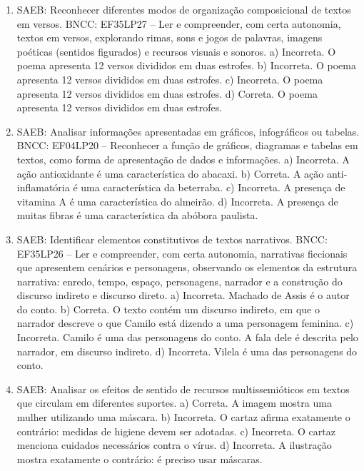 \begin{enumerate}
\item
SAEB: Reconhecer diferentes modos de organização composicional de textos em versos. BNCC: EF35LP27 -- Ler e compreender, com certa autonomia, textos em versos, explorando rimas, sons e jogos de palavras, imagens poéticas (sentidos figurados) e recursos visuais e sonoros. a) Incorreta. O poema apresenta 12 versos divididos em duas estrofes. b) Incorreta. O poema apresenta 12 versos divididos em duas estrofes. c) Incorreta. O poema apresenta 12 versos divididos em duas estrofes. d) Correta. O poema apresenta 12 versos divididos em duas estrofes.

\item
SAEB: Analisar informações apresentadas em gráficos, infográficos ou tabelas. BNCC: EF04LP20 -- Reconhecer a função de gráficos, diagramas e tabelas em textos, como forma de apresentação de dados e informações. a) Incorreta. A ação antioxidante é uma característica do abacaxi. b) Correta. A ação anti-inflamatória é uma característica da beterraba. c) Incorreta. A presença de vitamina A é uma característica do almeirão. d) Incorreta. A presença de muitas fibras é uma característica da abóbora paulista.

\item
SAEB: Identificar elementos constitutivos de textos narrativos. BNCC: EF35LP26 -- Ler e compreender, com certa autonomia, narrativas ficcionais que apresentem cenários e personagens, observando os elementos da estrutura narrativa: enredo, tempo, espaço, personagens, narrador e a construção do discurso indireto e discurso direto. a) Incorreta. Machado de Assis é o autor do conto. b) Correta. O texto contém um discurso indireto, em que o narrador descreve o que Camilo está dizendo a uma personagem feminina. c) Incorreta. Camilo é uma das personagens do conto. A fala dele é descrita pelo narrador, em discurso indireto. d) Incorreta. Vilela é uma das personagens do conto.

\item
SAEB: Analisar os efeitos de sentido de recursos multissemióticos em textos que circulam em diferentes suportes. a) Correta. A imagem mostra uma mulher utilizando uma máscara. b) Incorreta. O cartaz afirma exatamente o contrário: medidas de higiene devem ser adotadas. c) Incorreta. O cartaz menciona cuidados necessários contra o vírus. d) Incorreta. A ilustração mostra exatamente o contrário: é preciso
usar máscaras.
\end{enumerate}


